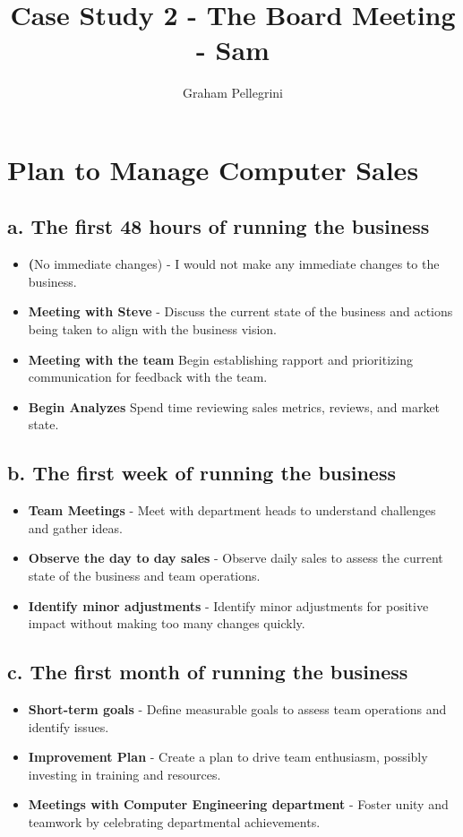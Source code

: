 \documentclass{article}
\title{Case Study 2 - The Board Meeting - Sam}
\author{Graham Pellegrini}
\date{}
\begin{document}
\maketitle

\section{Plan to Manage Computer Sales}

\subsection{a. The first 48 hours of running the business} 
\begin{itemize}
    \item \textbf(No immediate changes) - I would not make any immediate changes to the business.
    \item \textbf{Meeting with Steve} - Discuss the current state of the business and actions being taken to align with the business vision.
    \item \textbf{Meeting with the team} Begin establishing rapport and prioritizing communication for feedback with the team.
    \item \textbf{Begin Analyzes} Spend time reviewing sales metrics, reviews, and market state.
\end{itemize}


\subsection{b. The first week of running the business}
\begin{itemize}
    \item \textbf{Team Meetings} - Meet with department heads to understand challenges and gather ideas.
    \item \textbf{Observe the day to day sales} - Observe daily sales to assess the current state of the business and team operations.
    \item \textbf{Identify minor adjustments} - Identify minor adjustments for positive impact without making too many changes quickly.
\end{itemize}


\subsection{c. The first month of running the business}
\begin{itemize}
    \item \textbf{Short-term goals} - Define measurable goals to assess team operations and identify issues.
    \item \textbf{Improvement Plan} - Create a plan to drive team enthusiasm, possibly investing in training and resources.
    \item \textbf{Meetings with Computer Engineering department} - Foster unity and teamwork by celebrating departmental achievements.
\end{itemize}
\end{document}
